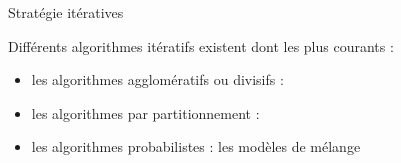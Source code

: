 \documentclass[10pt]{beamer}
\newcommand{\hsp}{\hspace*{1em}}
\begin{document}
\begin{frame}{Stratégie itératives}
	
Différents algorithmes itératifs existent dont les plus courants :\\[2em]

\begin{itemize}
	\item  \hsp les algorithmes agglomératifs ou divisifs :  \\[2em]
		\item  \hsp les algorithmes par partitionnement : \eg {} \\[2em]
			\item  \hsp les algorithmes probabilistes : les modèles de mélange\\[2em]
\end{itemize}
	
\end{frame}
\end{document}
